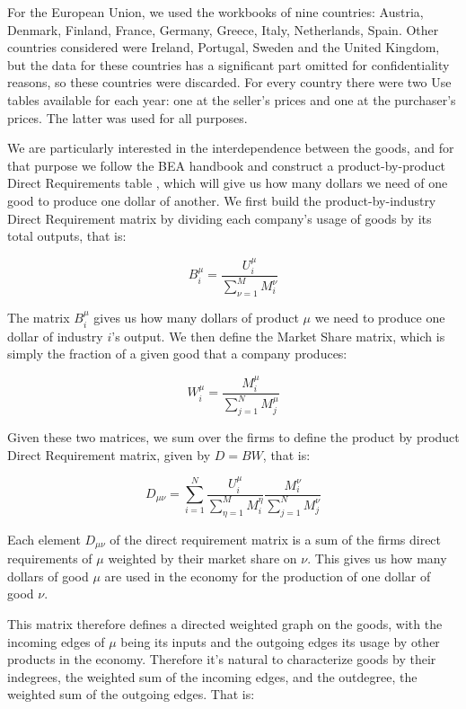 For the European Union, we used the workbooks of
nine countries: Austria, Denmark, Finland, France, Germany, Greece,
Italy, Netherlands, Spain. Other countries considered were
Ireland, Portugal, Sweden and the United Kingdom, but the data for
these countries has a significant part omitted for
confidentiality reasons, so these countries were discarded. For every country there were two Use tables available for each year:
one at the seller's prices and one at the purchaser's prices. The latter was used for all purposes.

We are particularly interested in the interdependence between the goods,
and for that purpose we follow the BEA handbook and construct a product-by-product Direct Requirements table
\cite{BEA_handbook}, which will give us how many dollars we need of
one good to produce one dollar of another. We first build the product-by-industry Direct Requirement matrix by
dividing each company's usage of goods by its total outputs, that is:

\begin{equation}
  \label{eq:dr_ic}
  B_i^\mu = \frac{U_i^\mu}{\sum_{\nu=1}^M M_i^\nu}
\end{equation}

The matrix $B_i^\mu$ gives us how many dollars of product $\mu$ we need to
produce one dollar of industry $i$'s output. We then define the
Market Share matrix, which is simply the fraction
of a given good that a company produces:

\begin{equation}
  \label{eq:market_share}
  W_i^\mu = \frac{M_i^\mu}{\sum_{j=1}^N M_j^\mu}
\end{equation}

Given these two matrices, we sum over the firms to define the product by product Direct
Requirement matrix, given by $D = B W$, that is:

\begin{equation}
  \label{eq:D}
  D_{\mu\nu} = \sum_{i=1}^N \frac{U_i^\mu}{\sum_{\eta=1}^M M_i^\eta} \frac{M_i^\nu}{\sum_{j=1}^N M_j^\nu}
\end{equation}

Each element $D_{\mu\nu}$ of the direct requirement matrix is a sum of
the firms direct requirements of $\mu$ weighted by their market share
on $\nu$. This gives us how many dollars of good $\mu$ are used in the
economy for the production of one dollar of good $\nu$.

This matrix therefore defines a directed weighted
graph on the goods, with the incoming edges of $\mu$ being its inputs
and the outgoing edges its usage by other products in the
economy. Therefore it's natural to characterize goods by their
indegrees, the weighted sum of the incoming edges, and the outdegree,
the weighted sum of the outgoing edges. That is:

